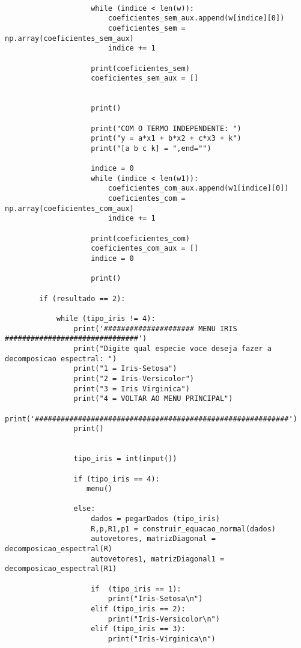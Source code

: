 \documentclass[a4paper,12pt,twoside]{article}
\begin{document}
\begin{lstlisting}
                    
                    while (indice < len(w)):
                        coeficientes_sem_aux.append(w[indice][0])
                        coeficientes_sem = np.array(coeficientes_sem_aux)
                        indice += 1
                    
                    print(coeficientes_sem)
                    coeficientes_sem_aux = []
                    
                        
                    print()
                    
                    print("COM O TERMO INDEPENDENTE: ")
                    print("y = a*x1 + b*x2 + c*x3 + k")
                    print("[a b c k] = ",end="")
                    
                    indice = 0
                    while (indice < len(w1)):
                        coeficientes_com_aux.append(w1[indice][0])
                        coeficientes_com = np.array(coeficientes_com_aux)
                        indice += 1
                    
                    print(coeficientes_com)
                    coeficientes_com_aux = []  
                    indice = 0
                   
                    print()
    
        if (resultado == 2):
            
            while (tipo_iris != 4):
                print('##################### MENU IRIS ###############################')
                print("Digite qual especie voce deseja fazer a decomposicao espectral: ")
                print("1 = Iris-Setosa")
                print("2 = Iris-Versicolor")
                print("3 = Iris Virginica")
                print("4 = VOLTAR AO MENU PRINCIPAL")
                print('###########################################################')
                print()
             
             
                tipo_iris = int(input())
                
                if (tipo_iris == 4):
                   menu()
                   
                else:
                    dados = pegarDados (tipo_iris)
                    R,p,R1,p1 = construir_equacao_normal(dados)
                    autovetores, matrizDiagonal = decomposicao_espectral(R)
                    autovetores1, matrizDiagonal1 = decomposicao_espectral(R1)
                    
                    if  (tipo_iris == 1):
                        print("Iris-Setosa\n")
                    elif (tipo_iris == 2):
                        print("Iris-Versicolor\n")
                    elif (tipo_iris == 3):
                        print("Iris-Virginica\n")
                    

\end{lstlisting}
\end{document}
